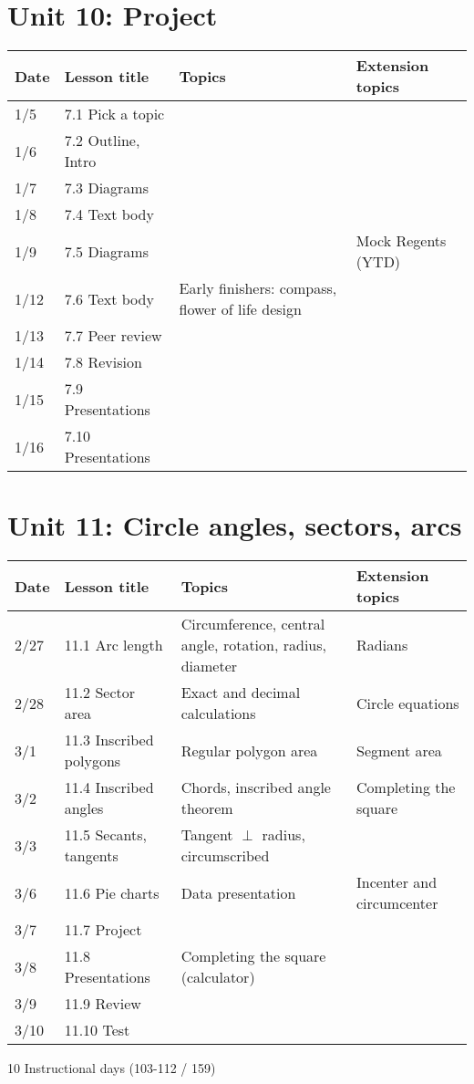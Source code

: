 \documentclass[12pt, twoside]{article}
\begin{document}
\section*{Unit 10: Project}
\begin{tabular}{|p{0.9cm}|p{4cm}|p{7cm}|p{5cm}|}
  \hline
  Date & Lesson title & Topics  & Extension topics \\
  \hline
  1/5 & 7.1 Pick a topic &  &  \\
  \hline
  1/6 & 7.2 Outline, Intro &  &  \\
  \hline
  1/7 & 7.3 Diagrams &  &  \\
  \hline
  1/8 & 7.4 Text body &  &  \\
  \hline
  1/9 & 7.5 Diagrams &  & Mock Regents (YTD) \\
  \hline
  1/12 & 7.6 Text body & Early finishers: compass, flower of life design &  \\
  \hline
  1/13 & 7.7 Peer review &  &  \\
  \hline
  1/14 & 7.8 Revision &  & \\
  \hline
  1/15 & 7.9 Presentations &  &  \\
  \hline
  1/16 & 7.10 Presentations &  & \\
  \hline

\end{tabular} \par \vspace*{0.3cm}

\section*{Unit 11: Circle angles, sectors, arcs}
\begin{tabular}{|p{0.9cm}|p{4cm}|p{7cm}|p{5cm}|}
  \hline
  Date & Lesson title & Topics  & Extension topics \\
  \hline
  2/27 & 11.1 Arc length & Circumference, central angle, rotation, radius, diameter & Radians \\
  \hline
  2/28 & 11.2 Sector area & Exact and decimal calculations & Circle equations \\
  \hline
  3/1 & 11.3 Inscribed polygons & Regular polygon area & Segment area \\
  \hline
  3/2 & 11.4 Inscribed angles & Chords, inscribed angle theorem & Completing the square \\
  \hline
  3/3 & 11.5 Secants, tangents & Tangent $\perp$ radius, circumscribed &  \\
  \hline
  3/6 & 11.6 Pie charts & Data presentation & Incenter and circumcenter \\
  \hline
  3/7 & 11.7 Project &  & \\
  \hline
  3/8 & 11.8 Presentations & Completing the square (calculator) &  \\
  \hline
  3/9 & 11.9 Review &  &  \\
  \hline
  3/10 & 11.10 Test &  &  \\
  \hline

\end{tabular} \par \vspace*{0.3cm}
10 Instructional days (103-112 / 159)
\end{document}
